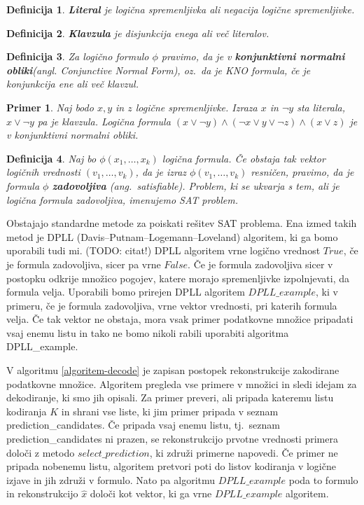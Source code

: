 \documentclass[12pt,a4paper]{article}
\newtheorem{definicija}{Definicija}
\newtheorem{primer}{Primer}
\begin{document}
\begin{definicija}
	\textbf{Literal} je logična spremenljivka ali negacija logične spremenljivke.
\end{definicija}

\begin{definicija}
	\textbf{Klavzula} je disjunkcija enega ali več literalov.
\end{definicija}

\begin{definicija}
	Za logično formulo $\phi$ pravimo, da je v \textbf{konjunktivni normalni obliki}(angl. Conjunctive Normal Form), 
	oz.~da je KNO formula, če je konjunkcija ene ali več klavzul.
\end{definicija}

\begin{primer}
	Naj bodo $x,y$ in $z$ logične spremenljivke. Izraza $x$ in $\lnot y$ sta literala, $x \lor \lnot y$ pa je klavzula.
	Logična formula $(x \lor \lnot y) \land (\lnot x \lor y \lor \lnot z) \land (x \lor z)$ je v konjunktivni normalni obliki.
\end{primer}

\begin{definicija}
	Naj bo $\phi(x_1,\ldots,x_k)$ logična formula.
	Če obstaja tak vektor logičnih vrednosti $(v_1, \ldots, v_k)$, da je izraz $\phi(v_1, \ldots, v_k)$ resničen,
	pravimo, da je formula $\phi$ \textbf{zadovoljiva} (ang.~satisfiable).
	Problem, ki se ukvarja s tem, ali je logična formula zadovoljiva, imenujemo SAT problem.
\end{definicija}

Obstajajo standardne metode za poiskati rešitev SAT problema. Ena izmed takih metod je DPLL (Davis--Putnam--Logemann--Loveland) algoritem, ki ga bomo uporabili tudi mi. (TODO: citat!)
DPLL algoritem vrne logično vrednost $True$, če je formula zadovoljiva, sicer pa vrne $False$. 
Če je formula zadovoljiva sicer v postopku odkrije množico pogojev, katere morajo spremenljivke izpolnjevati, da formula velja.
Uporabili bomo prirejen DPLL algoritem $DPLL\_example$, ki v primeru, če je formula zadovoljiva, vrne vektor vrednosti, pri katerih formula velja.
Če tak vektor ne obstaja, mora vsak primer podatkovne množice pripadati vsaj enemu listu in tako ne bomo nikoli rabili uporabiti algoritma DPLL\_example.

V algoritmu \ref{algoritem-decode} je zapisan postopek rekonstrukcije zakodirane podatkovne množice.
Algoritem pregleda vse primere v množici in sledi idejam za dekodiranje, ki smo jih opisali.
Za primer preveri, ali pripada kateremu listu kodiranja $K$ in shrani vse liste, ki jim primer pripada v seznam prediction\_candidates.
Če pripada vsaj enemu listu, tj.~seznam prediction\_candidates ni prazen, se rekonstrukcijo prvotne vrednosti primera določi z metodo $select\_prediction$, ki združi primerne napovedi.
Če primer ne pripada nobenemu listu, algoritem pretvori poti do listov kodiranja v logične izjave in jih združi v formulo.
Nato pa algoritmu $DPLL\_example$ poda to formulo in rekonstrukcijo $\hat{x}$ določi kot vektor, ki ga vrne $DPLL\_example$ algoritem.
\end{document}
